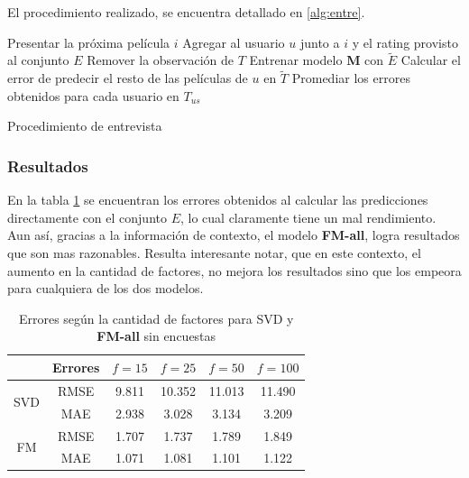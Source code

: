 \documentclass[hidelinks,12pt,a4paper]{book}
\theoremstyle{plain}
\theoremstyle{definition}
\begin{document}
El procedimiento realizado, se encuentra detallado en \ref{alg:entre}.

\begin{algorithm}[ht]
\begin{algorithmic}[ENTREVISTA]
\STATE Presentar la próxima película $i$
\STATE Agregar al usuario $u$ junto a $i$ y el rating provisto al conjunto $E$
\STATE Remover la observación de $T$
\ENDIF
\ENDWHILE
\STATE Entrenar modelo \textbf{M} con $\tilde{E}$
\STATE Calcular el error de predecir el resto de las películas de $u$ en $\tilde{T}$
\ENDFOR
\STATE Promediar los errores obtenidos para cada usuario en $T_{us}$
\end{algorithmic}
\caption{Procedimiento de entrevista}\label{alg:entre}
\end{algorithm}

\subsubsection{Resultados}

En la tabla \ref{tb:resul-base} se encuentran los errores obtenidos al calcular las predicciones directamente con el conjunto $E$, lo cual claramente tiene un mal rendimiento. Aun así, gracias a la información de contexto, el modelo \textbf{FM-all}, logra resultados que son mas razonables. Resulta interesante notar, que en este contexto, el aumento en la cantidad de factores, no mejora los resultados sino que los empeora para cualquiera de los dos modelos.

\begin{table}[ht]
\centering
\begin{tabular}{c|c|c c c c}
			& Errores & $f=15$ & $f=25$ & $f=50$ & $f=100$ \\
\hline
\multirow{2}{*}{SVD}& RMSE & 9.811 & 10.352 & 11.013 & 11.490 \\
					& MAE & 2.938 & 3.028 & 3.134 & 3.209 \\
\hline
\multirow{2}{*}{FM} & RMSE & 1.707 & 1.737 & 1.789 & 1.849 \\
					& MAE & 1.071 & 1.081 & 1.101 & 1.122\\
\end{tabular}
\caption{Errores según la cantidad de factores para SVD y \textbf{FM-all} sin encuestas}
\label{tb:resul-base}
\end{table}
\end{document}
